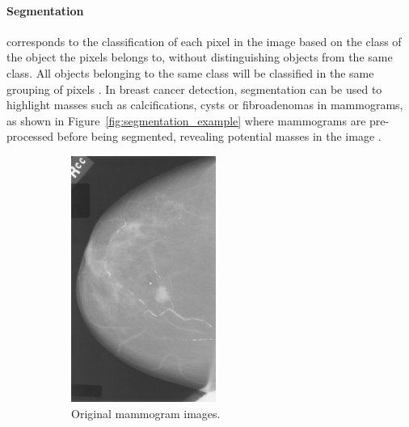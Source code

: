 \paragraph{Segmentation} corresponds to the classification of each pixel in the image based on the class of the object the pixels belongs to, without distinguishing objects from the same class. All objects belonging to the same class will be classified in the same grouping of pixels \cite{Geron2019}. In breast cancer detection, segmentation can be used to highlight masses such as calcifications, cysts or fibroadenomas \cite{breastcancerorg2018} in mammograms, as shown in Figure~\ref{fig:segmentation_example} where mammograms are pre-processed before being segmented, revealing potential masses in the image \cite{Pereira2014}.

\begin{figure}[h]
\centering
\begin{subfigure}{.5\textwidth}
  \centering
  \includegraphics[width=0.52\textwidth]{Dissertation/figures/litsurvey/original-mammogram.jpg}
  \caption{Original mammogram images.}
  \label{fig:original-mammogram}
\end{subfigure}%
\begin{subfigure}{.5\textwidth}
  \centering

\end{subfigure}
\end{figure}
